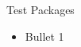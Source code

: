 \documentclass[letterpaper,10pt]{article}
\begin{document}
Test Packages
\begin{itemize}[leftmargin=*,noitemsep]
\item Bullet 1
\end{itemize}
\end{document}
